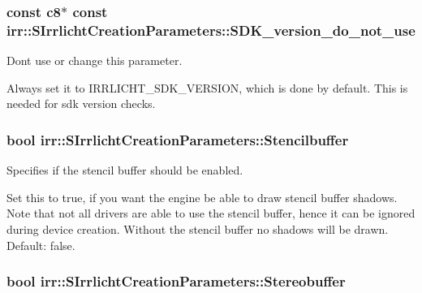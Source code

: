 \subsubsection[{\texorpdfstring{S\+D\+K\+\_\+version\+\_\+do\+\_\+not\+\_\+use}{SDK\_version\_do\_not\_use}}]{\setlength{\rightskip}{0pt plus 5cm}const {\bf c8}$\ast$ const irr\+::\+S\+Irrlicht\+Creation\+Parameters\+::\+S\+D\+K\+\_\+version\+\_\+do\+\_\+not\+\_\+use}\hypertarget{structirr_1_1SIrrlichtCreationParameters_af30f104af135b97d3e19fecaf2c10e45}{}\label{structirr_1_1SIrrlichtCreationParameters_af30f104af135b97d3e19fecaf2c10e45}


Don\textquotesingle{}t use or change this parameter. 

Always set it to I\+R\+R\+L\+I\+C\+H\+T\+\_\+\+S\+D\+K\+\_\+\+V\+E\+R\+S\+I\+ON, which is done by default. This is needed for sdk version checks. 
\subsubsection[{\texorpdfstring{Stencilbuffer}{Stencilbuffer}}]{\setlength{\rightskip}{0pt plus 5cm}bool irr\+::\+S\+Irrlicht\+Creation\+Parameters\+::\+Stencilbuffer}\hypertarget{structirr_1_1SIrrlichtCreationParameters_a8120cfeac3fbf8b12b1e5f6bd6a8ec2f}{}\label{structirr_1_1SIrrlichtCreationParameters_a8120cfeac3fbf8b12b1e5f6bd6a8ec2f}


Specifies if the stencil buffer should be enabled. 

Set this to true, if you want the engine be able to draw stencil buffer shadows. Note that not all drivers are able to use the stencil buffer, hence it can be ignored during device creation. Without the stencil buffer no shadows will be drawn. Default\+: false. 
\subsubsection[{\texorpdfstring{Stereobuffer}{Stereobuffer}}]{\setlength{\rightskip}{0pt plus 5cm}bool irr\+::\+S\+Irrlicht\+Creation\+Parameters\+::\+Stereobuffer}\hypertarget{structirr_1_1SIrrlichtCreationParameters_ae5dd722bd6c5a7001b73ef92264220a5}{}\label{structirr_1_1SIrrlichtCreationParameters_ae5dd722bd6c5a7001b73ef92264220a5}


